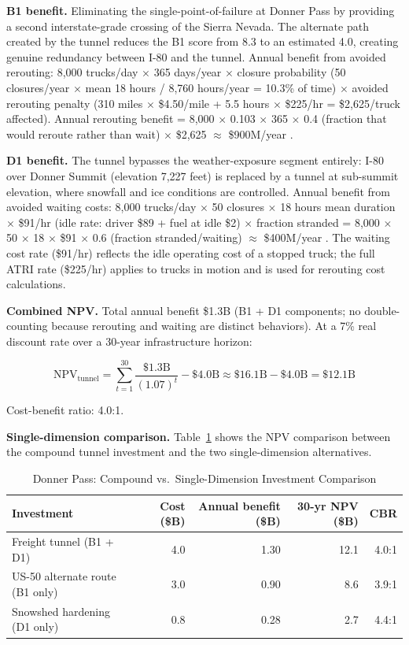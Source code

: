 \textbf{B1 benefit.} Eliminating the single-point-of-failure at Donner Pass by providing a second interstate-grade crossing of the Sierra Nevada. The alternate path created by the tunnel reduces the B1 score from 8.3 to an estimated 4.0, creating genuine redundancy between I-80 and the tunnel. Annual benefit from avoided rerouting: 8,000 trucks/day $\times$ 365 days/year $\times$ closure probability (50 closures/year $\times$ mean 18 hours / 8,760 hours/year = 10.3\% of time) $\times$ avoided rerouting penalty (310 miles $\times$ \$4.50/mile + 5.5 hours $\times$ \$225/hr = \$2,625/truck affected). Annual rerouting benefit = 8,000 $\times$ 0.103 $\times$ 365 $\times$ 0.4 (fraction that would reroute rather than wait) $\times$ \$2,625 $\approx$ \$900M/year \citep{ATRI_costs2024}.

\textbf{D1 benefit.} The tunnel bypasses the weather-exposure segment entirely: I-80 over Donner Summit (elevation 7,227 feet) is replaced by a tunnel at sub-summit elevation, where snowfall and ice conditions are controlled. Annual benefit from avoided waiting costs: 8,000 trucks/day $\times$ 50 closures $\times$ 18 hours mean duration $\times$ \$91/hr (idle rate: driver \$89 + fuel at idle \$2) $\times$ fraction stranded = 8,000 $\times$ 50 $\times$ 18 $\times$ \$91 $\times$ 0.6 (fraction stranded/waiting) $\approx$ \$400M/year \citep{ATRI_costs2024}. The waiting cost rate (\$91/hr) reflects the idle operating cost of a stopped truck; the full ATRI rate (\$225/hr) applies to trucks in motion and is used for rerouting cost calculations.

\textbf{Combined NPV.} Total annual benefit \$1.3B (B1 + D1 components; no double-counting because rerouting and waiting are distinct behaviors). At a 7\% real discount rate over a 30-year infrastructure horizon:

\begin{equation}
\text{NPV}_{\text{tunnel}} = \sum_{t=1}^{30} \frac{\$1.3\text{B}}{(1.07)^t} - \$4.0\text{B} \approx \$16.1\text{B} - \$4.0\text{B} = \$12.1\text{B}
\end{equation}

Cost-benefit ratio: 4.0:1.

\textbf{Single-dimension comparison.} Table~\ref{tab:donner-comparison} shows the NPV comparison between the compound tunnel investment and the two single-dimension alternatives.

\begin{table}[h!]
\centering
\caption{Donner Pass: Compound vs.\ Single-Dimension Investment Comparison}
\label{tab:donner-comparison}
\begin{tabular}{lrrrr}
\toprule
\textbf{Investment} & \textbf{Cost (\$B)} & \textbf{Annual benefit (\$B)} & \textbf{30-yr NPV (\$B)} & \textbf{CBR} \\
\midrule
Freight tunnel (B1 + D1) & 4.0 & 1.30 & 12.1 & 4.0:1 \\
US-50 alternate route (B1 only) & 3.0 & 0.90 & 8.6 & 3.9:1 \\
Snowshed hardening (D1 only)  & 0.8 & 0.28 & 2.7 & 4.4:1 \\
\bottomrule
\end{tabular}
\end{table}


